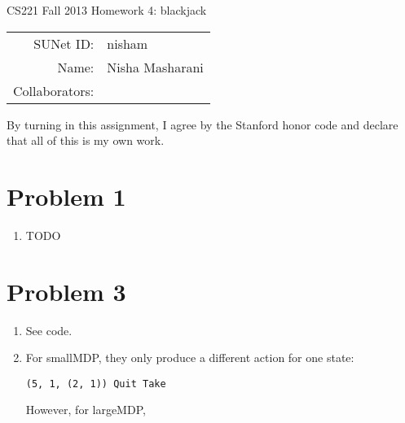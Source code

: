 \documentclass[12pt]{article}
\begin{document}
\begin{center}
{\Large CS221 Fall 2013 Homework 4: blackjack}

\begin{tabular}{rl}
SUNet ID: & nisham\\
Name: & Nisha Masharani \\
Collaborators: & 
\end{tabular}
\end{center}

By turning in this assignment, I agree by the Stanford honor code and declare
that all of this is my own work.

\section*{Problem 1}

\begin{enumerate}[label=(\alph*)]
  \item TODO
\end{enumerate}

\section*{Problem 3}

\begin{enumerate}[label=(\alph*)]
  \item See code.
  \item For smallMDP, they only produce a different action for one state:
  \begin{verbatim}
(5, 1, (2, 1)) Quit Take
  \end{verbatim}
  However, for largeMDP, 
\end{enumerate}
\end{document}
